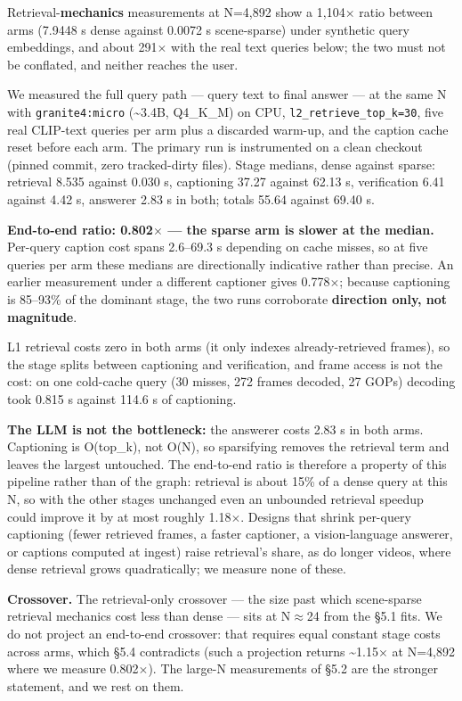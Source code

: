 \documentclass[sigconf,review,anonymous]{acmart}
\begin{document}
Retrieval-\textbf{mechanics} measurements at N=4,892 show a 1,104\ensuremath{\times} ratio between arms (7.9448 s
dense against 0.0072 s scene-sparse) under synthetic query embeddings, and about 291\ensuremath{\times} with the
real text queries below; the two must not be conflated, and neither reaches the user.

We measured the full query path --- query text to final answer --- at the same N with
\texttt{granite4:micro} (\textasciitilde3.4B, Q4\_K\_M) on CPU, \texttt{l2\_retrieve\_top\_k=30}, five real CLIP-text queries
per arm plus a discarded warm-up, and the caption cache reset before each arm. The primary
run is instrumented on a clean checkout (pinned commit, zero tracked-dirty files). Stage medians,
dense against sparse: retrieval 8.535 against 0.030 s, captioning 37.27 against 62.13 s,
verification 6.41 against 4.42 s, answerer 2.83 s in both; totals 55.64 against 69.40 s.


\textbf{End-to-end ratio: 0.802\ensuremath{\times} --- the sparse arm is slower at the median.} Per-query caption cost spans
2.6--69.3 s depending on cache misses, so at five queries per arm these medians are
directionally indicative rather than precise. An earlier measurement under a different
captioner gives 0.778\ensuremath{\times}; because captioning is 85--93\% of the dominant stage, the two runs
corroborate \textbf{direction only, not magnitude}.

L1 retrieval costs zero in both arms (it only indexes already-retrieved frames), so the stage
splits between captioning and verification, and frame access is not the cost: on one cold-cache
query (30 misses, 272 frames decoded, 27 GOPs) decoding took 0.815 s against 114.6 s of captioning.

\textbf{The LLM is not the bottleneck:} the answerer costs 2.83 s in both arms. Captioning is
O(top\_k), not O(N), so sparsifying removes the retrieval term and leaves the largest untouched.
The end-to-end ratio is therefore a property of this pipeline rather than of the graph: retrieval
is about 15\% of a dense query at this N, so with the other stages unchanged even an unbounded
retrieval speedup could improve it by at most roughly 1.18\ensuremath{\times}. Designs that shrink per-query
captioning (fewer retrieved frames, a faster captioner, a vision-language answerer, or captions
computed at ingest) raise retrieval's share, as do longer videos, where dense retrieval grows
quadratically; we measure none of these.

\textbf{Crossover.} The retrieval-only crossover --- the size past which scene-sparse retrieval
mechanics cost less than dense --- sits at N\ensuremath{\approx}24 from the §5.1 fits. We do not project an
end-to-end crossover: that requires equal constant stage costs across arms, which §5.4
contradicts (such a projection returns \textasciitilde1.15\ensuremath{\times} at N=4,892 where we measure 0.802\ensuremath{\times}). The
large-N measurements of §5.2 are the stronger statement, and we rest on them.
\end{document}
